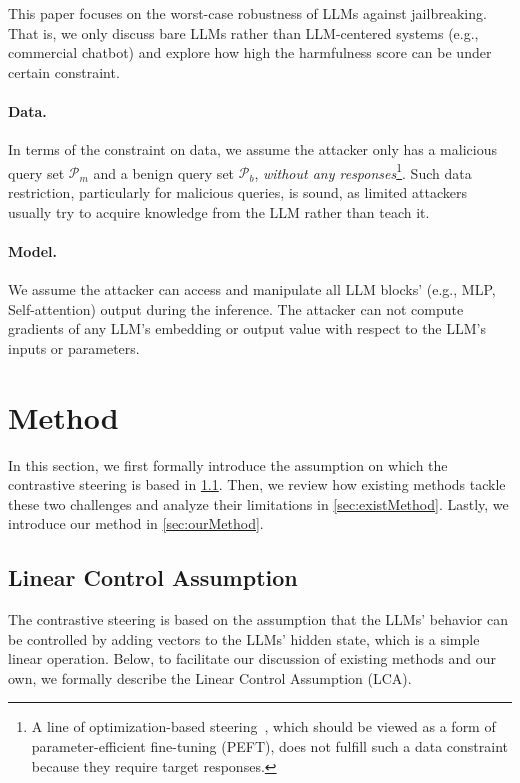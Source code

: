 \documentclass{article}
\theoremstyle{plain}
\theoremstyle{definition}
\theoremstyle{remark}
\begin{document}
This paper focuses on the worst-case robustness of LLMs against jailbreaking. That is, we only discuss bare LLMs rather than LLM-centered systems (e.g., commercial chatbot) and explore how high the harmfulness score can be under certain constraint.

\paragraph{Data.} In terms of the constraint on data, we assume the attacker only has a malicious query set $\mathcal{P}_{m}$ and a benign query set $\mathcal{P}_{b}$, \emph{without any responses}\footnote{A line of optimization-based steering~\cite{bipo, oneshot}, which should be viewed as a form of parameter-efficient fine-tuning (PEFT), does not fulfill such a data constraint because they require target responses.}. Such data restriction, particularly for malicious queries, is sound, as limited attackers usually try to acquire knowledge from the LLM rather than teach it.

\paragraph{Model.} We assume the attacker can access and manipulate all LLM blocks' (e.g., MLP, Self-attention) output during the inference. The attacker can not compute gradients of any LLM's embedding or output value with respect to the LLM's inputs or parameters.

\section{Method}\label{sec:method}

In this section, we first formally introduce the assumption on which the contrastive steering is based in \cref{sec:lca}. Then, we review how existing methods tackle these two challenges and analyze their limitations in \cref{sec:existMethod}. Lastly, we introduce our method in \cref{sec:ourMethod}.


\subsection{Linear Control Assumption}\label{sec:lca}

The contrastive steering is based on the assumption that the LLMs' behavior can be controlled by adding vectors to the LLMs' hidden state, which is a simple linear operation. Below, to facilitate our discussion of existing methods and our own, we formally describe the Linear Control Assumption (LCA).
\end{document}
